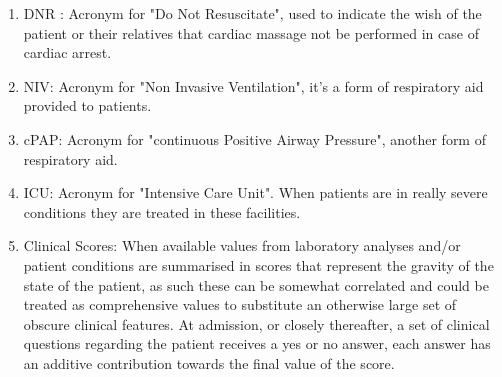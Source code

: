 \begin{enumerate}\label{clinical_features}
\item DNR : Acronym for "Do Not Resuscitate", used to indicate the wish of the patient or their relatives that cardiac massage not be performed in case of cardiac arrest.
\item NIV: Acronym for "Non Invasive Ventilation", it's a form of respiratory aid provided to patients.
\item cPAP: Acronym for  "continuous Positive Airway Pressure", another form of respiratory aid.
\item ICU: Acronym for "Intensive Care Unit". When patients are in really severe conditions they are treated in these facilities.
\item Clinical Scores: When available values from laboratory analyses and/or patient conditions are summarised in scores that represent the gravity of the state of the patient, as such these can be somewhat correlated and could be treated as comprehensive values to substitute an otherwise large set of obscure clinical features. At admission, or closely thereafter, a set of clinical questions regarding the patient receives a yes or no answer, each answer has an additive contribution towards the final value of the score.


\end{enumerate}
